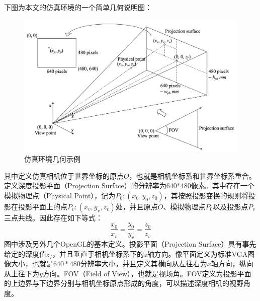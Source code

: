 下图为本文的仿真环境的一个简单几何说明图：
\begin{figure}[htb]
	\centering 
	\includegraphics[width=\textwidth]{./mypic/projection.jpg} 
	\caption{仿真环境几何示例} 
\end{figure}

其中定义仿真相机位于世界坐标的原点$O$，也就是相机坐标系和世界坐标系重合。定义深度投影平面（Projection Surface）的分辨率为640*480像素。其中存在一个模拟物理点（Physical Point），记为$P_0:(x_0,y_0,z_0)$，其按照投影变换的规则将投影在投影平面上的点$P_v:(x_v,y_v,z_v)$处，并且原点$O$、模拟物理点$P_0$以及投影点$P_v$三点共线。因此存在如下等式：
\begin{equation}
	\frac{x_0}{x_v}=\frac{y_0}{y_v}=\frac{z_0}{z_v}
\end{equation}
图中涉及另外几个OpenGL的基本定义。投影平面（Projection Surface）具有事先给定的深度值$z_f$，并且垂直于相机坐标系下的$z$轴方向。像平面定义为标准VGA图像大小，也就是$640*480$分辨率大小，并且定义其横向从左往右为$x$轴方向，纵向从上往下为$y$方向。FOV（Field of View），也就是视场角。FOV定义为投影平面的上边界与下边界分别与相机坐标原点形成的角度，可以描述深度相机的视野角度。

